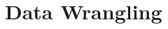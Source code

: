 \documentclass[a4paper,11pt,twoside]{article}
\begin{document}
\section{Data Wrangling}











\end{document}
